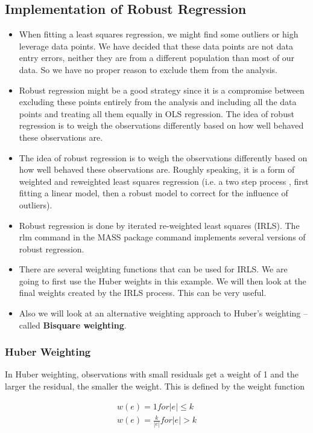 \subsection{Implementation of Robust Regression}
\begin{itemize}
\item When fitting a least squares regression, we might find some outliers or high leverage data points.  We have decided that these data points are not data entry errors, neither they are from a different population than most of our data. So we have no proper reason to exclude them from the analysis.  

\item Robust regression might be a good strategy since it is a compromise between excluding these points entirely from the analysis and including all the data points and treating all them equally in OLS regression. The idea of robust regression is to weigh the observations differently based on how well behaved these observations are.

\item 
The idea of robust regression is to weigh the observations differently based on how well behaved these observations are. Roughly speaking, it is a form of weighted and reweighted least squares regression (i.e. a two step process , first fitting a linear model, then a robust model to correct for the influence of outliers).
\item 
Robust regression is done by iterated re-weighted least squares (IRLS). The rlm command in the MASS package command implements several versions of robust regression.
\item 
There are several weighting functions that can be used for IRLS. We are going to first use the Huber weights in this example. We will then look at the final weights created by the IRLS process. This can be very useful. 
\item 
Also we will look at an alternative weighting approach to Huber’s weighting – called \textbf{Bisquare weighting}. 
\end{itemize}
\subsubsection{Huber Weighting}
In Huber weighting, observations with small residuals get a weight of 1 and the larger the residual, the smaller the weight. This is defined by the weight function


\begin{eqnarray}
w(e) = 1 for |e| \leq k  \\
w(e) = \frac{k}{|e|} for |e| > k
\end{eqnarray}


